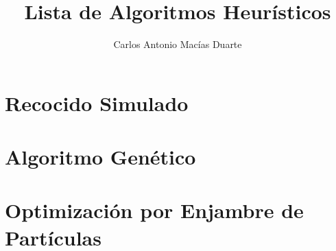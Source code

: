 \documentclass[10pt,letterpaper,twoside,openright]{article}
\author{Carlos Antonio Macías Duarte}
\title{Lista de Algoritmos Heurísticos}
\begin{document}
	\maketitle
		
	\tableofcontents
	
	\section{Recocido Simulado}
	
	\section{Algoritmo Genético}
	
	\section{Optimización por Enjambre de Partículas}
	
	
		
	
\end{document}
